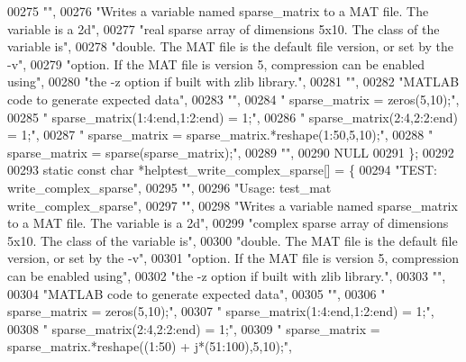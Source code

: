 \begin{DoxyCode}
00275     \textcolor{stringliteral}{""},
00276     \textcolor{stringliteral}{"Writes a variable named sparse\_matrix to a MAT file. The variable is a 2d"},
00277     \textcolor{stringliteral}{"real sparse array of dimensions 5x10. The class of the variable is"},
00278     \textcolor{stringliteral}{"double. The MAT file is the default file version, or set by the -v"},
00279     \textcolor{stringliteral}{"option. If the MAT file is version 5, compression can be enabled using"},
00280     \textcolor{stringliteral}{"the -z option if built with zlib library."},
00281     \textcolor{stringliteral}{""},
00282     \textcolor{stringliteral}{"MATLAB code to generate expected data"},
00283     \textcolor{stringliteral}{""},
00284     \textcolor{stringliteral}{"    sparse\_matrix = zeros(5,10);"},
00285     \textcolor{stringliteral}{"    sparse\_matrix(1:4:end,1:2:end) = 1;"},
00286     \textcolor{stringliteral}{"    sparse\_matrix(2:4,2:2:end) = 1;"},
00287     \textcolor{stringliteral}{"    sparse\_matrix = sparse\_matrix.*reshape(1:50,5,10);"},
00288     \textcolor{stringliteral}{"    sparse\_matrix = sparse(sparse\_matrix);"},
00289     \textcolor{stringliteral}{""},
00290     NULL
00291 \};
00292 
00293 \textcolor{keyword}{static} \textcolor{keyword}{const} \textcolor{keywordtype}{char} *helptest\_write\_complex\_sparse[] = \{
00294     \textcolor{stringliteral}{"TEST: write\_complex\_sparse"},
00295     \textcolor{stringliteral}{""},
00296     \textcolor{stringliteral}{"Usage: test\_mat write\_complex\_sparse"},
00297     \textcolor{stringliteral}{""},
00298     \textcolor{stringliteral}{"Writes a variable named sparse\_matrix to a MAT file. The variable is a 2d"},
00299     \textcolor{stringliteral}{"complex sparse array of dimensions 5x10. The class of the variable is"},
00300     \textcolor{stringliteral}{"double. The MAT file is the default file version, or set by the -v"},
00301     \textcolor{stringliteral}{"option. If the MAT file is version 5, compression can be enabled using"},
00302     \textcolor{stringliteral}{"the -z option if built with zlib library."},
00303     \textcolor{stringliteral}{""},
00304     \textcolor{stringliteral}{"MATLAB code to generate expected data"},
00305     \textcolor{stringliteral}{""},
00306     \textcolor{stringliteral}{"    sparse\_matrix = zeros(5,10);"},
00307     \textcolor{stringliteral}{"    sparse\_matrix(1:4:end,1:2:end) = 1;"},
00308     \textcolor{stringliteral}{"    sparse\_matrix(2:4,2:2:end) = 1;"},
00309     \textcolor{stringliteral}{"    sparse\_matrix = sparse\_matrix.*reshape((1:50) + j*(51:100),5,10);"},

\end{DoxyCode}
